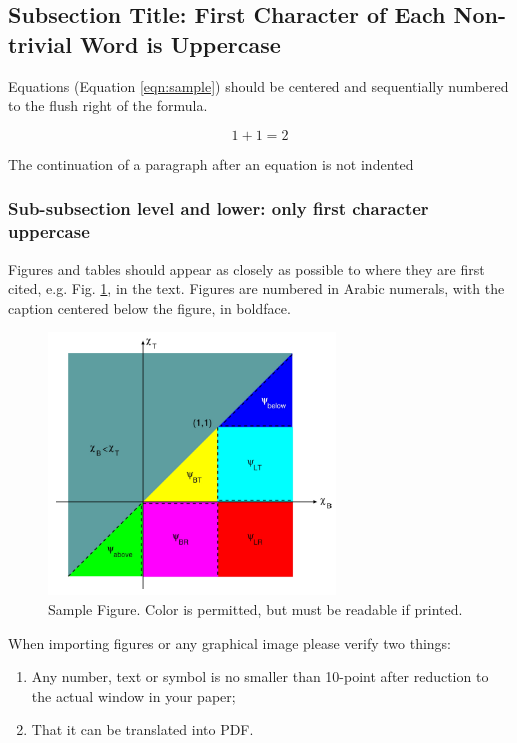 \documentclass{mc2015}
\begin{document}
\subsection{Subsection Title: First Character of Each Non-trivial Word is Uppercase}

Equations (Equation \ref{eqn:sample}) should be centered and sequentially numbered to the flush right of the formula.

\begin{equation}
  1+1=2
  \label{eqn:sample}
\end{equation}

\noindent
The continuation of a paragraph after an equation is not indented

\subsubsection{Sub-subsection level and lower: only first character uppercase}

Figures and tables should appear as closely as possible to where they are first cited, e.g. 
Fig. \ref{fig:sample}, in the text.  Figures are numbered in Arabic numerals, with the caption centered below the figure, in boldface. 

\begin{figure}[H]
  \centering
  \includegraphics[width=3in]{figure.png}
  \caption{Sample Figure. Color is permitted, but must be readable if printed.}
  \label{fig:sample}
\end{figure}

When importing figures or any graphical image please verify two things:
\begin{enumerate}
\item Any number, text or symbol is no smaller than 10-point after reduction to the actual window in your paper;
\item That it can be translated into PDF.
\end{enumerate}
\end{document}
